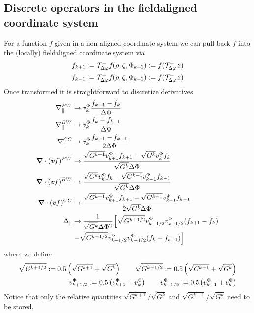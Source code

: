 \subsection{Discrete operators in the fieldaligned coordinate system}
For a function $f$ given in a non-aligned coordinate system we can pull-back
$f$ into the (locally) fieldaligned coordinate system via
\begin{align}
    f_{k+1} := \mathcal T^-_{\Delta\varphi} f( {\rho},{\zeta},{\Phi}_{k+1}) := f( \mathcal T^+_{\Delta\varphi} {\boldsymbol{z}}) \\
    f_{k-1} := \mathcal T^+_{\Delta\varphi} f( {\rho},{\zeta},{\Phi}_{k-1}) := f( \mathcal T^-_{\Delta\varphi} {\boldsymbol{z}})
\end{align}
Once transformed it is straightforward to discretize derivatives
\begin{align}
    \nabla_\parallel^{FW} &\rightarrow v^{\Phi}_k \frac{f_{k+1} - f_k}{\Delta{\Phi}} \label{eq:forward}\\
    \nabla_\parallel^{BW} &\rightarrow v^{\Phi}_k \frac{f_{k} - f_{k-1}}{\Delta{\Phi}} \label{eq:backward} \\
    \nabla_\parallel^{CC} &\rightarrow v^{\Phi}_k \frac{f_{k+1} - f_{k-1}}{2\Delta{\Phi}}\label{eq:centered} \\
    {\boldsymbol{\nabla}}\cdot({\boldsymbol{v}} f)^{FW} &\rightarrow\frac{\sqrt{G^{k+1}} v^{\Phi}_{k+1} f_{k+1} - \sqrt{G^k} v^{\Phi}_k f_k}{\sqrt{G^k}\Delta{\Phi}} \label{eq:divForward}\\
    {\boldsymbol{\nabla}}\cdot({\boldsymbol{v}} f)^{BW} &\rightarrow \frac{\sqrt{G^{k}} v^{\Phi}_{k} f_{k} - \sqrt{G^{k-1}} v^{\Phi}_{k-1} f_{k-1}}{\sqrt{G^k}\Delta{\Phi}}\label{eq:divBackward}\\
    {\boldsymbol{\nabla}}\cdot({\boldsymbol{v}} f)^{CC} &\rightarrow \frac{\sqrt{G^{k+1}} v^{\Phi}_{k+1} f_{k+1} - \sqrt{G^{k-1}} v^{\Phi}_{k-1} f_{k-1}}{2\sqrt{G^k}\Delta{\Phi}} \label{eq:divCentered}\\
    \Delta_\parallel &\rightarrow \frac{1}{\sqrt{G^k}\Delta{\Phi}^2}\left[\sqrt{G^{k+1/2}} v^{\Phi}_{k+1/2} v^{\Phi}_{k+1/2}(f_{k+1}-f_k)
    \right.   \nonumber\\ &\left.
    - \sqrt{G^{k-1/2}}v^{\Phi}_{k-1/2}v^{\Phi}_{k-1/2}(f_k- f_{k-1})\right] \label{eq:laplace}
\end{align}
where we define
\begin{align}
    \sqrt{G^{k+1/2}} := 0.5\left( \sqrt{G^{k+1}} + \sqrt{G^k}\right)
    \qquad
    \sqrt{G^{k-1/2}} := 0.5\left( \sqrt{G^{k-1}} + \sqrt{G^k}\right)\\
    v^{\Phi}_{k+1/2} := 0.5\left( v^{\Phi}_{k+1} + v^{\Phi}_k\right)
    \qquad
    v^{\Phi}_{k-1/2} := 0.5\left( v^{\Phi}_{k-1} + v^{\Phi}_k\right)
\end{align}
Notice that only the relative quantities $\sqrt{G^{k+1}}/\sqrt{G^k}$ and $\sqrt{G^{k-1}}/\sqrt{G^k}$ need to be stored.
